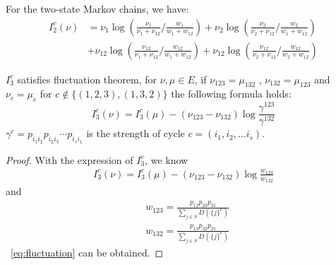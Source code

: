 \documentclass[11pt,en,cite=authoryear]{elegantpaper}
\begin{document}
\begin{corollary}
    For the two-state Markov chains, we have:
    \begin{align*}
    I_2^c(\nu) 
    &= \nu_{1}\log(\frac{\nu_{1}}{\nu_{1}+\nu_{12}}/\frac{w_{1}}{w_{1}+w_{12}}) 
    + \nu_{2} \log(\frac{\nu_{2}}{\nu_{2}+\nu_{12}}/\frac{w_{2}}{w_{1}+w_{12}}) \\
    &+ \nu_{12} \log (\frac{\nu_{12}}{\nu_{1}+\nu_{12}}/\frac{w_{12}}{w_{1}+w_{12}})
    + \nu_{12} \log (\frac{\nu_{12}}{\nu_{2}+\nu_{12}}/\frac{w_{12}}{w_{2}+w_{12}})
\end{align*}
\end{corollary}

\begin{corollary}
    $I_3^c$ satisfies fluctuation theorem, for $\nu, \mu \in E$, if $\nu_{123} = \mu_{132}$ , $\nu_{132} = \mu_{123}$ and $\nu_c = \mu_c$ for $c \notin \{(1,2,3), (1,3,2)\}$ the following formula holds:
    \begin{equation} \label{eq:fluctuation}
        I_3^c(\nu) = I_3^c(\mu) - (\nu_{123} - \nu_{132}) \log \frac{\gamma^{123}}{\gamma^{132}}
    \end{equation}
    $\gamma^c = p_{i_1 i_2} p_{i_2 i_3} \cdots p_{i_s i_1}$ is the strength of cycle $c=(i_1, i_2, \dots i_s)$.
\end{corollary}
\begin{proof}
    With the expression of $I_3^c$, we know
    \begin{align*}
        I_3^c(\nu) = I_3^c(\mu) - (\nu_{123} - \nu_{132}) \log \frac{w_{123}}{w_{132}}
    \end{align*}
    and
    \begin{align*}
        &w_{123} = \frac{p_{12} p_{23} p_{31}}{\sum_{j\in S} D(\{j\}^c)} \\
        &w_{132} = \frac{p_{13} p_{32} p_{21}}{\sum_{j\in S} D(\{j\}^c)}
    \end{align*}
    ~\ref{eq:fluctuation} can be obtained.
\end{proof}
\end{document}
